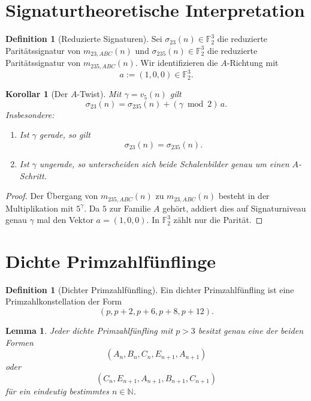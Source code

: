 \documentclass[11pt,a4paper]{article}
\newtheorem{lemma}[satz]{Lemma}
\newtheorem{korollar}[satz]{Korollar}
\theoremstyle{definition}
\newtheorem{definition}[satz]{Definition}
\theoremstyle{remark}
\begin{document}
	\section{Signaturtheoretische Interpretation}
	
	\begin{definition}[Reduzierte Signaturen]
		Sei \(\sigma_{23}(n)\in\mathbb{F}_2^3\) die reduzierte Paritätssignatur von \(m_{23,ABC}(n)\) und
		\(\sigma_{235}(n)\in\mathbb{F}_2^3\) die reduzierte Paritätssignatur von \(m_{235,ABC}(n)\).
		Wir identifizieren die \(A\)-Richtung mit
		\[
		a:=(1,0,0)\in\mathbb{F}_2^3.
		\]
	\end{definition}
	
	\begin{korollar}[Der \(A\)-Twist]
		Mit \(\gamma=v_5(n)\) gilt
		\[
		\sigma_{23}(n)=\sigma_{235}(n)+(\gamma\bmod 2)\,a.
		\]
		Insbesondere:
		\begin{enumerate}[label=\textup{(\roman*)}]
			\item Ist \(\gamma\) gerade, so gilt
			\[
			\sigma_{23}(n)=\sigma_{235}(n).
			\]
			\item Ist \(\gamma\) ungerade, so unterscheiden sich beide Schalenbilder genau um einen
			\(A\)-Schritt.
		\end{enumerate}
	\end{korollar}
	
	\begin{proof}
		Der Übergang von \(m_{235,ABC}(n)\) zu \(m_{23,ABC}(n)\) besteht in der Multiplikation mit
		\(5^\gamma\). Da \(5\) zur Familie \(A\) gehört, addiert dies auf Signaturniveau genau \(\gamma\)
		mal den Vektor \(a=(1,0,0)\). In \(\mathbb{F}_2^3\) zählt nur die Parität.
	\end{proof}
	
	\section{Dichte Primzahlfünflinge}
	
	\begin{definition}[Dichter Primzahlfünfling]
		Ein dichter Primzahlfünfling ist eine Primzahlkonstellation der Form
		\[
		(p,p+2,p+6,p+8,p+12).
		\]
	\end{definition}
	
	\begin{lemma}
		Jeder dichte Primzahlfünfling mit \(p>3\) besitzt genau eine der beiden Formen
		\[
		(A_n,B_n,C_n,E_{n+1},A_{n+1})
		\]
		oder
		\[
		(C_n,E_{n+1},A_{n+1},B_{n+1},C_{n+1})
		\]
		für ein eindeutig bestimmtes \(n\in\mathbb{N}\).
	\end{lemma}
	
\end{document}
